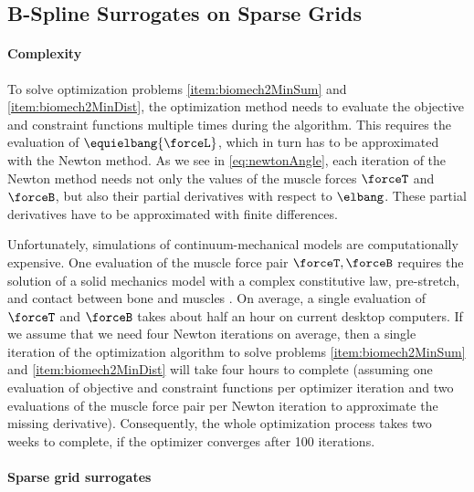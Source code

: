 \subsection{B-Spline Surrogates on Sparse Grids}
\label{sec:723surrogates}

\paragraph{Complexity}

To solve optimization problems
\ref{item:biomech2MinSum} and \ref{item:biomech2MinDist},
the optimization method needs to evaluate the objective
and constraint functions multiple times during the algorithm.
This requires the evaluation of $\equielbang{\forceL}$,
which in turn has to be approximated with the Newton method.
As we see in \cref{eq:newtonAngle},
each iteration of the Newton method needs not only the values of the
muscle forces $\forceT$ and $\forceB$, but also their
partial derivatives with respect to $\elbang$.
These partial derivatives have to be approximated with finite differences.

Unfortunately, simulations of continuum-mechanical models are
computationally expensive.
One evaluation of the muscle force pair $\forceT, \forceB$
requires the solution of a solid mechanics model
with a complex constitutive law, pre-stretch, and contact between
bone and muscles \cite{Valentin18Gradient}.
On average, a single evaluation of $\forceT$ and $\forceB$ takes
about half an hour on current desktop computers.
%
If we assume that we need four Newton iterations on average,
then a single iteration of the optimization algorithm to solve
problems \ref{item:biomech2MinSum} and \ref{item:biomech2MinDist}
will take four hours to complete
(assuming one evaluation of objective and constraint functions
per optimizer iteration and
two evaluations of the muscle force pair
per Newton iteration to approximate the missing derivative).
Consequently, the whole optimization process takes
two weeks to complete, if the optimizer converges after 100 iterations.

\paragraph{Sparse grid surrogates}

